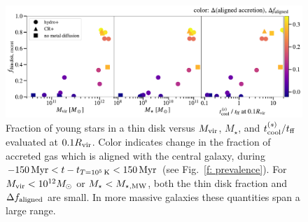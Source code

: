 \documentclass[fleqn,usenatbib]{mnras}
\newcommand{\tcon}{t_{T=10^5\,{\rm K}}}
\begin{document}
\begin{figure}
    \centering
    \includegraphics[width=\textwidth]{figures/prevalence/aligned_fraction_vs_galaxy_props.pdf}
    \caption{
    Fraction of young stars in a thin disk versus $M_{\rm vir}$, $M_\star$, and $t_{\rm cool}^{(s)}/t_{\rm ff}$ evaluated at $0.1 R_{\rm vir}$.
    Color indicates change in the fraction of accreted gas which is aligned with the central galaxy, during $-150\,{\rm Myr} < t-\tcon < 150\,{\rm Myr}$ (see Fig.~\ref{f: prevalence}).
    For $M_{\rm vir} < 10^{12} M_\odot$ or $M_\star < M_{\star, {\rm MW}}$, both the thin disk fraction and $\Delta f_{\rm aligned}$ are small.
    In more massive galaxies these quantities span a large range.
    }
    \label{f: prevalence vs galaxy properties}
\end{figure}

\newcommand{\tcoolsh}{t_{\rm cool}^{(s)}}
\newcommand{\tff}{t_{\rm ff}}
\newcommand{\Mvir}{M_{\rm vir}}
\end{document}
